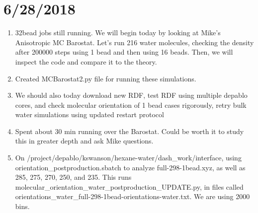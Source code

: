 \documentclass[12pt,reqno]{amsart}
\numberwithin{equation}{section}
\begin{document}
\section{6/28/2018}
\begin{enumerate}
\item 32bead jobs still running.  We will begin today by looking at Mike's Anisotropic MC Barostat.  Let's run 216 water molecules, checking the density after 200000 steps using 1 bead and then using 16 beads.  Then, we will inspect the code and compare it to the theory.  
\item Created MCBarostat2.py file for running these simulations. 
\item We should also today download new RDF, test RDF using multiple depablo cores, and check molecular orientation of 1 bead cases rigorously, retry bulk water simulations using updated restart protocol 
\item Spent about 30 min running over the Barostat.  Could be worth it to study this in greater depth and ask Mike questions.  
\item On /project/depablo/kswanson/hexane-water/dash\_work/interface, using orientation\_postproduction.sbatch to analyze full-298-1bead.xyz, as well as 285, 275, 270, 250, and 235.  This runs molecular\_orientation\_water\_postproduction\_UPDATE.py, in files called orientations\_water\_full-298-1bead-orientations-water.txt.  We are using 2000 bins.  
\end{enumerate}
\end{document}
